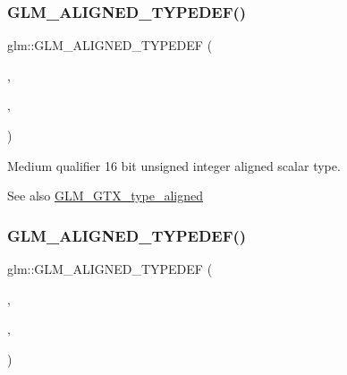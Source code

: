 \subsubsection{\texorpdfstring{G\+L\+M\+\_\+\+A\+L\+I\+G\+N\+E\+D\+\_\+\+T\+Y\+P\+E\+D\+E\+F()}{GLM\_ALIGNED\_TYPEDEF()}\hspace{0.1cm}{\footnotesize\ttfamily [90/209]}}
{\footnotesize\ttfamily glm\+::\+G\+L\+M\+\_\+\+A\+L\+I\+G\+N\+E\+D\+\_\+\+T\+Y\+P\+E\+D\+EF (\begin{DoxyParamCaption}\item[{\mbox{\hyperlink{group__gtc__type__precision_ga6745262ef6a6fdb8637b2387ef924828}{mediump\+\_\+u16}}}]{,  }\item[{aligned\+\_\+mediump\+\_\+u16}]{,  }\item[{2}]{ }\end{DoxyParamCaption})}

Medium qualifier 16 bit unsigned integer aligned scalar type. \begin{DoxySeeAlso}{See also}
\mbox{\hyperlink{group__gtx__type__aligned}{G\+L\+M\+\_\+\+G\+T\+X\+\_\+type\+\_\+aligned}} 
\end{DoxySeeAlso}
\mbox{\label{group__gtx__type__aligned_gad6a7c0b5630f89d3f1c5b4ef2919bb4c}} 
\subsubsection{\texorpdfstring{G\+L\+M\+\_\+\+A\+L\+I\+G\+N\+E\+D\+\_\+\+T\+Y\+P\+E\+D\+E\+F()}{GLM\_ALIGNED\_TYPEDEF()}\hspace{0.1cm}{\footnotesize\ttfamily [91/209]}}
{\footnotesize\ttfamily glm\+::\+G\+L\+M\+\_\+\+A\+L\+I\+G\+N\+E\+D\+\_\+\+T\+Y\+P\+E\+D\+EF (\begin{DoxyParamCaption}\item[{\mbox{\hyperlink{group__gtc__type__precision_gad0c27a525045c299a92306eb4cd7c13a}{mediump\+\_\+u32}}}]{,  }\item[{aligned\+\_\+mediump\+\_\+u32}]{,  }\item[{4}]{ }\end{DoxyParamCaption})}

